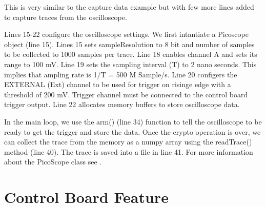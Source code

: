 \documentclass[letterpaper,10pt,english]{sphinxmanual}
\begin{document}
This is very similar to the capture data example but with few more lines added to capture traces
from the oscilloscope.

Lines 15-22 configure the oscilloscope settings. We first intantiate a Picoscope object (line 15).
Lines  15 sets sampleResolution to 8 bit and number of samples to be collected to 1000 samples per trace.
Line 18 enables channel A and sets its range to 100 mV.
Line 19 sets the sampling interval (T) to 2 nano seconds. This implies that ampling rate is 1/T = 500 M Sample/s.
Line 20 configers the EXTERNAL (Ext) channel to be used for trigger on risinge edge with a threshold of 200 mV.
Trigger channel must be connected to the control board trigger output.
Line 22 allocates memory buffers to store oscilloscope data.

In the main loop, we use the arm() (line 34) function to tell the oscilloscope to be ready to get the trigger and store the
data. Once the crypto operation is over, we can collect the trace from the memory as a numpy array using the
readTrace() method (line 40). The trace is saved into a file in line 41.
For more information about the PicoScope class see {\hyperref[\detokenize{reference_doc:Picoscope}]{}}.


\chapter{Control Board Feature}
\label{\detokenize{controller_features:control-board-feature}}\label{\detokenize{controller_features::doc}}
\end{document}
